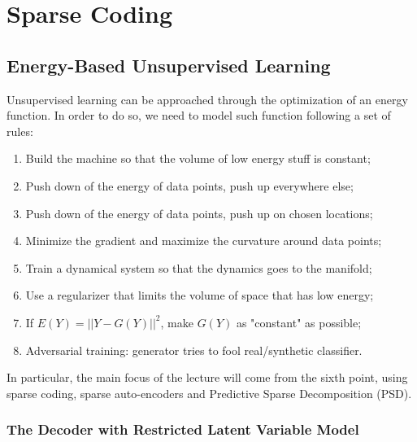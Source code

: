 \chapter{Sparse Coding}


\section{Energy-Based Unsupervised Learning}
Unsupervised learning can be approached through the optimization of an energy function. In order to do so, we need to model such function following a set of rules:
\begin{enumerate}
    \item Build the machine so that the volume of low energy stuff is constant;
    \item Push down of the energy of data points, push up everywhere else;
    \item Push down of the energy of data points, push up on chosen locations;
    \item Minimize the gradient and maximize the curvature around data points;
    \item Train a dynamical system so that the dynamics goes to the manifold;
    \item Use a regularizer that limits the volume of space that has low energy;
    \item If $E(Y) = ||Y - G(Y)||^2$, make $G(Y)$ as "constant" as possible;
    \item Adversarial training: generator tries to fool real/synthetic classifier.
\end{enumerate}%


In particular, the main focus of the lecture will come from the sixth point, using sparse coding, sparse auto-encoders and Predictive Sparse Decomposition (PSD).

\subsection{The Decoder with Restricted Latent Variable Model}

